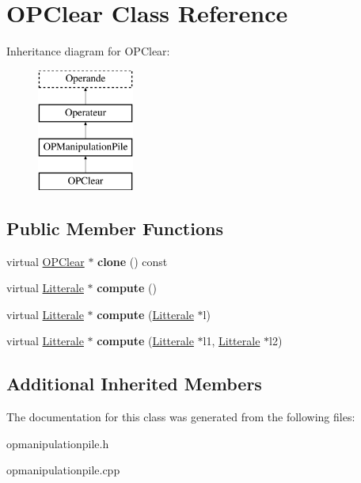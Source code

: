 \hypertarget{class_o_p_clear}{}\section{O\+P\+Clear Class Reference}
\label{class_o_p_clear}
Inheritance diagram for O\+P\+Clear\+:\begin{figure}[H]
\begin{center}
\leavevmode
\includegraphics[height=4.000000cm]{class_o_p_clear}
\end{center}
\end{figure}
\subsection*{Public Member Functions}
\begin{DoxyCompactItemize}
\item 
virtual \hyperlink{class_o_p_clear}{O\+P\+Clear} $\ast$ {\bfseries clone} () const \hypertarget{class_o_p_clear_a32bdcfc46b4d04179154ae61d01b2448}{}\label{class_o_p_clear_a32bdcfc46b4d04179154ae61d01b2448}

\item 
virtual \hyperlink{class_litterale}{Litterale} $\ast$ {\bfseries compute} ()\hypertarget{class_o_p_clear_ad241fe8f1562ef42f2278416792c0865}{}\label{class_o_p_clear_ad241fe8f1562ef42f2278416792c0865}

\item 
virtual \hyperlink{class_litterale}{Litterale} $\ast$ {\bfseries compute} (\hyperlink{class_litterale}{Litterale} $\ast$l)\hypertarget{class_o_p_clear_ac84498a89811d3519d8b58ad3fc8e6e7}{}\label{class_o_p_clear_ac84498a89811d3519d8b58ad3fc8e6e7}

\item 
virtual \hyperlink{class_litterale}{Litterale} $\ast$ {\bfseries compute} (\hyperlink{class_litterale}{Litterale} $\ast$l1, \hyperlink{class_litterale}{Litterale} $\ast$l2)\hypertarget{class_o_p_clear_ac3e6e5fa309a868eac86b0e25481bc6c}{}\label{class_o_p_clear_ac3e6e5fa309a868eac86b0e25481bc6c}

\end{DoxyCompactItemize}
\subsection*{Additional Inherited Members}


The documentation for this class was generated from the following files\+:\begin{DoxyCompactItemize}
\item 
opmanipulationpile.\+h\item 
opmanipulationpile.\+cpp\end{DoxyCompactItemize}
